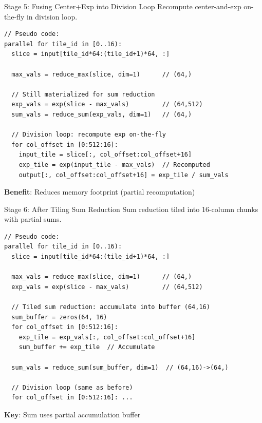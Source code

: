 \documentclass[aspectratio=169]{beamer}
\begin{document}
\begin{frame}[fragile]{Stage 5: Fusing Center+Exp into Division Loop}
Recompute center-and-exp on-the-fly in division loop.

\begin{lstlisting}
// Pseudo code:
parallel for tile_id in [0..16):
  slice = input[tile_id*64:(tile_id+1)*64, :]

  max_vals = reduce_max(slice, dim=1)      // (64,)

  // Still materialized for sum reduction
  exp_vals = exp(slice - max_vals)         // (64,512)
  sum_vals = reduce_sum(exp_vals, dim=1)   // (64,)

  // Division loop: recompute exp on-the-fly
  for col_offset in [0:512:16]:
    input_tile = slice[:, col_offset:col_offset+16]
    exp_tile = exp(input_tile - max_vals)  // Recomputed
    output[:, col_offset:col_offset+16] = exp_tile / sum_vals
\end{lstlisting}

\vspace{0.2cm}
\textbf{Benefit}: Reduces memory footprint (partial recomputation)
\end{frame}

\begin{frame}[fragile]{Stage 6: After Tiling Sum Reduction}
Sum reduction tiled into 16-column chunks with partial sums.

\begin{lstlisting}
// Pseudo code:
parallel for tile_id in [0..16):
  slice = input[tile_id*64:(tile_id+1)*64, :]

  max_vals = reduce_max(slice, dim=1)      // (64,)
  exp_vals = exp(slice - max_vals)         // (64,512)

  // Tiled sum reduction: accumulate into buffer (64,16)
  sum_buffer = zeros(64, 16)
  for col_offset in [0:512:16]:
    exp_tile = exp_vals[:, col_offset:col_offset+16]
    sum_buffer += exp_tile  // Accumulate

  sum_vals = reduce_sum(sum_buffer, dim=1)  // (64,16)->(64,)

  // Division loop (same as before)
  for col_offset in [0:512:16]: ...
\end{lstlisting}

\vspace{0.2cm}
\textbf{Key}: Sum uses partial accumulation buffer
\end{frame}
\end{document}
